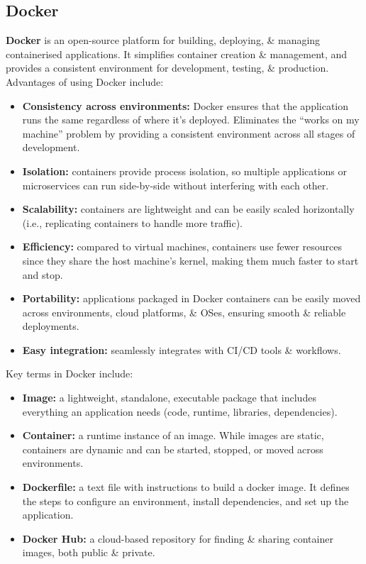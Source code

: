 \documentclass[a4paper,11pt]{article}
\begin{document}
\subsection{Docker}
\textbf{Docker} is an open-source platform for building, deploying, \& managing containerised applications.
It simplifies container creation \& management, and provides a consistent environment for development, testing, \&
production.
Advantages of using Docker include:
\begin{itemize}
    \item   \textbf{Consistency across environments:} Docker ensures that the application runs the same regardless
            of where it's deployed.
            Eliminates the ``works on my machine'' problem by providing a consistent environment across all 
            stages of development.
    \item   \textbf{Isolation:} containers provide process isolation, so multiple applications or microservices can
            run side-by-side without interfering with each other.
    \item   \textbf{Scalability:} containers are lightweight and can be easily scaled horizontally (i.e., 
            replicating containers to handle more traffic).
    \item   \textbf{Efficiency:} compared to virtual machines, containers use fewer resources since they share
            the host machine's kernel, making them much faster to start and stop.
    \item   \textbf{Portability:} applications packaged in Docker containers can be easily moved across
            environments, cloud platforms, \& OSes, ensuring smooth \& reliable deployments.
    \item   \textbf{Easy integration:} seamlessly integrates with CI/CD tools \& workflows.
\end{itemize}

Key terms in Docker include:
\begin{itemize}
    \item   \textbf{Image:} a lightweight, standalone, executable package that includes everything an application 
            needs (code, runtime, libraries, dependencies).
    \item   \textbf{Container:} a runtime instance of an image.
            While images are static, containers are dynamic and can be started, stopped, or moved across environments.
    \item   \textbf{Dockerfile:} a text file with instructions to build a docker image.
            It defines the steps to configure an environment, install dependencies, and set up the application.
    \item   \textbf{Docker Hub:} a cloud-based repository for finding \& sharing container images, both public \&
            private.
\end{itemize}
\end{document}
